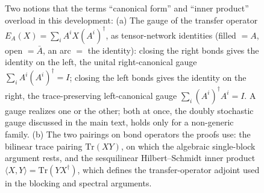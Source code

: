 \begin{figure}[t]
    \caption{Two notions that the terms ``canonical form'' and ``inner
        product'' overload in this development: (a) The gauge of the transfer
        operator $E_A(X)=\sum_i A^i X {(A^i)}^\dagger$, as tensor-network
        identities (filled $=A$, open $=\bar A$, an arc $=$ the identity):
        closing the right bonds gives the identity on the left, the unital
        right-canonical gauge $\sum_i A^i {(A^i)}^\dagger=I$; closing the left bonds
        gives the identity on the right, the trace-preserving left-canonical
        gauge $\sum_i {(A^i)}^\dagger A^i=I$. A gauge realizes one or the other;
        both at once, the doubly stochastic gauge discussed in the main text, holds only for a non-generic family.
        (b) The two
        pairings on bond operators the proofs use: the bilinear trace pairing
        $\mathrm{Tr}(XY)$, on which the algebraic single-block argument rests, and
        the sesquilinear Hilbert--Schmidt inner product
        $\langle X,Y\rangle=\mathrm{Tr}(Y X^\dagger)$, which defines the
        transfer-operator adjoint used in the blocking and spectral arguments.}\label{fig:gauge_innerproduct}
\end{figure}

